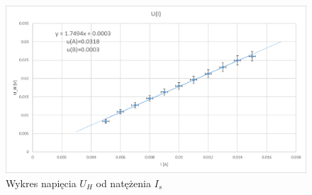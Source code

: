 \documentclass{article}
\begin{document}
\begin{figure}
    \centering
    \includegraphics{U_H_od_I.png}
    \caption{Wykres napięcia $U_{H}$ od natężenia $I_{s}$}
    \label{fig:rys4}
\end{figure}
\end{document}
